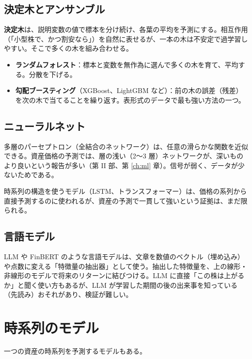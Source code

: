 \subsection{決定木とアンサンブル}

\textbf{決定木}は、説明変数の値で標本を分け続け、各葉の平均を予測にする。相互作用（「小型株で、かつ割安なら」）を自然に表せるが、一本の木は不安定で過学習しやすい。そこで多くの木を組み合わせる。

\begin{itemize}
\item \textbf{ランダムフォレスト}：標本と変数を無作為に選んで多くの木を育て、平均する。分散を下げる。
\item \textbf{勾配ブースティング}（XGBoost、LightGBM など）：前の木の誤差（残差）を次の木で当てることを繰り返す。表形式のデータで最も強い方法の一つ。
\end{itemize}

\subsection{ニューラルネット}

多層のパーセプトロン（全結合のネットワーク）は、任意の滑らかな関数を近似できる。資産価格の予測では、層の浅い（2〜3 層）ネットワークが、深いものより良いという報告が多い（第 II 部、第 \ref{ch:ml} 章）。信号が弱く、データが少ないためである。

時系列の構造を使うモデル（LSTM、トランスフォーマー）は、価格の系列から直接予測するのに使われるが、資産の予測で一貫して強いという証拠は、まだ限られる。

\subsection{言語モデル}

LLM や FinBERT のような言語モデルは、文章を数値のベクトル（埋め込み）や点数に変える「特徴量の抽出器」として使う。抽出した特徴量を、上の線形・非線形のモデルで将来のリターンに結びつける。LLM に直接「この株は上がるか」と聞く使い方もあるが、LLM が学習した期間の後の出来事を知っている（先読み）おそれがあり、検証が難しい。

\section{時系列のモデル}

一つの資産の時系列を予測するモデルもある。

